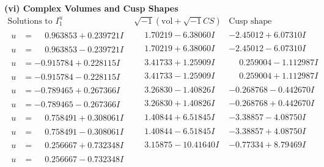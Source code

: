 \documentclass[1p]{elsarticle_modified}
\theoremstyle{definition}
\newcommand{\I}{\sqrt{-1}}
\begin{document}
\newpage\flushleft \textbf{(vi) Complex Volumes and Cusp Shapes}
$$\begin{array}{c|c|c}  
\text{Solutions to }I^u_{1}& \I (\text{vol} + \sqrt{-1}CS) & \text{Cusp shape}\\
 \hline 
\begin{aligned}
u &= \phantom{-}0.963853 + 0.239721 I\end{aligned}
 & \phantom{-}1.70219 - 6.38060 I & -2.45012 + 6.07310 I \\ \hline\begin{aligned}
u &= \phantom{-}0.963853 - 0.239721 I\end{aligned}
 & \phantom{-}1.70219 + 6.38060 I & -2.45012 - 6.07310 I \\ \hline\begin{aligned}
u &= -0.915784 + 0.228115 I\end{aligned}
 & \phantom{-}3.41733 + 1.25909 I & \phantom{-}0.259004 - 1.112987 I \\ \hline\begin{aligned}
u &= -0.915784 - 0.228115 I\end{aligned}
 & \phantom{-}3.41733 - 1.25909 I & \phantom{-}0.259004 + 1.112987 I \\ \hline\begin{aligned}
u &= -0.789465 + 0.267366 I\end{aligned}
 & \phantom{-}3.26830 - 1.40826 I & -0.268768 - 0.442670 I \\ \hline\begin{aligned}
u &= -0.789465 - 0.267366 I\end{aligned}
 & \phantom{-}3.26830 + 1.40826 I & -0.268768 + 0.442670 I \\ \hline\begin{aligned}
u &= \phantom{-}0.758491 + 0.308061 I\end{aligned}
 & \phantom{-}1.40844 + 6.51845 I & -3.38857 - 4.08750 I \\ \hline\begin{aligned}
u &= \phantom{-}0.758491 - 0.308061 I\end{aligned}
 & \phantom{-}1.40844 - 6.51845 I & -3.38857 + 4.08750 I \\ \hline\begin{aligned}
u &= \phantom{-}0.256667 + 0.732348 I\end{aligned}
 & \phantom{-}3.15875 - 10.41640 I & -0.77334 + 8.79469 I \\ \hline\begin{aligned}
u &= \phantom{-}0.256667 - 0.732348 I\end{aligned}

\end{array}$$
\end{document}
